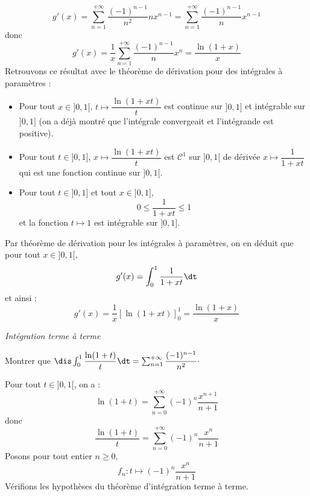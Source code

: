 \documentclass[a4paper,10pt]{report}
\begin{document}
\begin{enumerate}
$$g'(x) =  \sum_{n=1}^{+ \infty} \dfrac{(-1)^{n-1}}{n^2} nx^{n-1} = \sum_{n=1}^{+ \infty} \dfrac{(-1)^{n-1}}{n} x^{n-1}$$
donc 
$$ g'(x) = \dfrac{1}{x} \sum_{n=1}^{+ \infty} \dfrac{(-1)^{n-1}}{n} x^{n} = \dfrac{\ln(1+x)}{x}$$
Retrouvons ce résultat avec le théorème de dérivation pour des intégrales à paramètres :
\begin{itemize}
\item Pour tout $x \in ]0,1[$, $t \mapsto \dfrac{\ln(1+xt)}{t}$ est continue sur $]0,1]$ et intégrable sur $]0,1]$ (on a déjà montré que l'intégrale convergeait et l'intégrande est positive).
\item Pour tout $t \in ]0,1]$, $x \mapsto \dfrac{\ln(1+xt)}{t}$ est $\mathcal{C}^1$ sur $]0,1[$ de dérivée $x \mapsto \dfrac{1}{1+xt}$ qui est une fonction continue sur $]0,1[$.
\item Pour tout $t \in ]0,1]$ et tout $x \in ]0,1]$,
$$ 0 \leq \dfrac{1}{1+xt} \leq 1$$
et la fonction $t \mapsto 1$ est intégrable sur $]0,1]$.
\end{itemize}
Par théorème de dérivation pour les intégrales à paramètres, on en déduit que pour tout $x \in ]0,1[$,
$$ g'(x) = \int_{0}^1 \dfrac{1}{1+xt} \dt$$
et ainsi :
$$ g'(x) = \dfrac{1}{x} [ \ln(1+xt) ]_0^1 = \dfrac{\ln(1+x)}{x}$$
\end{enumerate}
\medskip

\begin{center}
\textit{{ {\large Intégration terme à terme}}}
\end{center}

\medskip

\begin{Exercice}{} Montrer que $\dis \int_{0}^1 \dfrac{\ln(1+t)}{t}\dt = \sum_{n=1}^{+ \infty} \dfrac{(-1)^{n-1}}{n^2} \cdot$
\end{Exercice}

\corr Pour tout $t \in ]0,1[$, on a :
$$ \ln(1+t) = \sum_{n=0}^{+ \infty} (-1)^{n} \dfrac{x^{n+1}}{n+1}$$
donc
$$ \dfrac{\ln(1+t)}{t} = \sum_{n=0}^{+ \infty} (-1)^{n} \dfrac{x^{n}}{n+1}$$
Posons pour tout entier $n \geq 0$,
$$ f_n : t \mapsto (-1)^{n} \dfrac{x^{n}}{n+1}$$
Vérifions les hypothèses du théorème d'intégration terme à terme.
\end{document}
